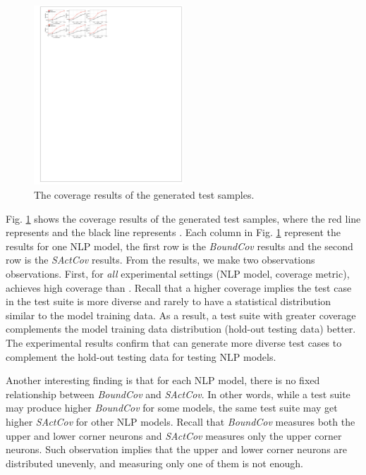 
\begin{figure}
    \centering
    \includegraphics[width=0.5\textwidth]{figs/covergae.pdf}
    \caption{The coverage results of the generated test
      samples. }
    \label{fig:coverage}
\end{figure}


Fig. \ref{fig:coverage} shows the coverage results of the generated
test samples, where the red line represents \tool and the black line
represents \Cklst.  Each column in Fig. \ref{fig:coverage} represent
the results for one NLP model, the first row is the \textit{BoundCov}
results and the second row is the \textit{SActCov} results.  From the
results, we make two observations observations. First, for \emph{all}
experimental settings (\eg NLP model, coverage metric), \tool achieves
high coverage than \Cklst. Recall that a higher coverage implies the
test case in the test suite is more diverse and rarely to have a
statistical distribution similar to the model training data. As a
result, a test suite with greater coverage complements the model
training data distribution (\ie hold-out testing data) better.  The
experimental results confirm that \tool can generate more diverse test
cases to complement the hold-out testing data for testing NLP models.
 

Another interesting finding is that for each NLP model, there is no
fixed relationship between \textit{BoundCov} and \textit{SActCov}. In
other words, while a test suite may produce higher \textit{BoundCov}
for some models, the same test suite may get higher \textit{SActCov}
for other NLP models.  Recall that \textit{BoundCov} measures both the
upper and lower corner neurons and \textit{SActCov} measures only the
upper corner neurons.  Such observation implies that the upper and
lower corner neurons are distributed unevenly, and measuring only one
of them is not enough.

